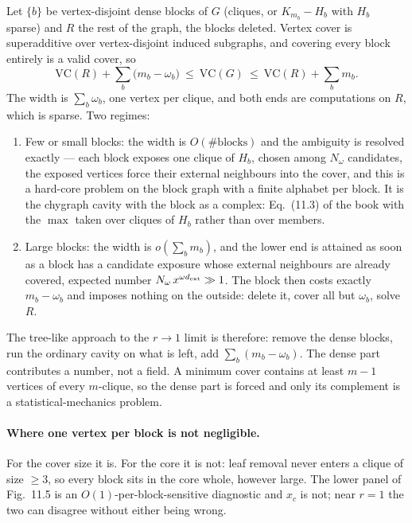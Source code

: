 \documentclass[11pt]{article}
\newcommand{\VC}{\mathrm{VC}}
\begin{document}
Let $\{b\}$ be vertex-disjoint dense blocks of $G$ (cliques, or $K_{m_b}-H_b$
with $H_b$ sparse) and $R$ the rest of the graph, the blocks deleted. Vertex
cover is superadditive over vertex-disjoint induced subgraphs, and covering
every block entirely is a valid cover, so
\begin{equation}
  \VC(R)+\sum_b\bigl(m_b-\omega_b\bigr)\ \le\ \VC(G)\ \le\ \VC(R)+\sum_b m_b .
  \label{eq:bracket}
\end{equation}
The width is $\sum_b\omega_b$, one vertex per clique, and both ends are
computations on $R$, which is sparse. Two regimes:
\begin{enumerate}
\item Few or small blocks: the width is $O(\#\text{blocks})$ and the
  ambiguity is resolved exactly --- each block exposes one clique of $H_b$,
  chosen among $N_\omega$ candidates, the exposed vertices force their
  external neighbours into the cover, and this is a hard-core problem on the
  block graph with a finite alphabet per block. It is the chygraph cavity with
  the block as a complex: Eq.~(11.3) of the book with the $\max$ taken over
  cliques of $H_b$ rather than over members.
\item Large blocks: the width is $o(\sum_b m_b)$, and the lower end is
  attained as soon as a block has a candidate exposure whose external
  neighbours are already covered, expected number $N_\omega\,x^{\omega
  d_{\rm ext}}\gg1$. The block then costs exactly $m_b-\omega_b$ and imposes
  nothing on the outside: delete it, cover all but $\omega_b$, solve $R$.
\end{enumerate}
The tree-like approach to the $r\to1$ limit is therefore: remove the dense
blocks, run the ordinary cavity on what is left, add
$\sum_b(m_b-\omega_b)$. The dense part contributes a number, not a field.
A minimum cover contains at least $m-1$ vertices of every $m$-clique, so the
dense part is forced and only its complement is a statistical-mechanics
problem.

\paragraph{Where one vertex per block is not negligible.} For the cover size it
is. For the core it is not: leaf removal never enters a clique of size $\ge3$,
so every block sits in the core whole, however large. The lower panel of
Fig.~11.5 is an $O(1)$-per-block-sensitive diagnostic and $x_c$ is not; near
$r=1$ the two can disagree without either being wrong.
\end{document}
